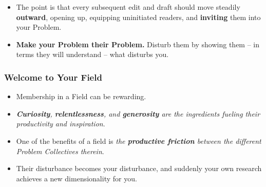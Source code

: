 \documentclass[11pt]{article}
\begin{document}
\begin{itemize}
\begin{exercise}
\begin{itemize}
\item  The point is that every subsequent edit and draft should move steadily \textbf{outward}, opening up, equipping uninitiated readers, and \textbf{inviting} them into your Problem. 

\item \textbf{Make your Problem their Problem.} Disturb them by showing them -- in terms they will understand -- what disturbs you. 
\end{itemize}

\end{exercise} 
\end{itemize}
\subsubsection{Welcome to Your Field}
\begin{itemize}
\item Membership in a Field can be rewarding. 

\item \emph{\textbf{Curiosity}, \textbf{relentlessness}, and \textbf{generosity} are the ingredients fueling their productivity and inspiration}. 

\item One of the benefits of a field is \emph{the \textbf{productive friction} between the different Problem Collectives therein}.

\item Their disturbance becomes your disturbance, and suddenly your own research achieves a new dimensionality for you.
\end{itemize}
\end{document}
